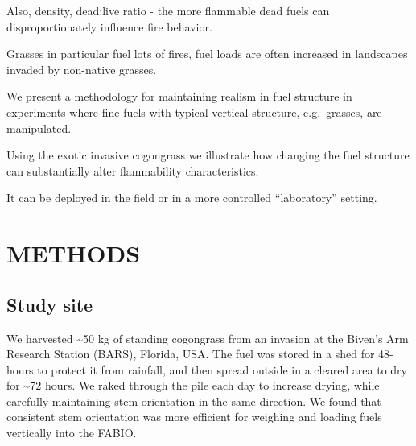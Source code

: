 \documentclass[11pt,a4paper]{article}
\begin{document}
Also, density, dead:live ratio - the more flammable dead fuels can
disproportionately influence fire behavior.

Grasses in particular fuel lots of fires, fuel loads are often increased
in landscapes invaded by non-native grasses.

We present a methodology for maintaining realism in fuel structure in
experiments where fine fuels with typical vertical structure,
e.g.~grasses, are manipulated.

Using the exotic invasive cogongrass we illustrate how changing the fuel
structure can substantially alter flammability characteristics.

It can be deployed in the field or in a more controlled ``laboratory''
setting.

\hypertarget{methods}{%
\section{METHODS}\label{methods}}

\hypertarget{study-site}{%
\subsection{Study site}\label{study-site}}

We harvested \textasciitilde{}50 kg of standing cogongrass from an
invasion at the Biven's Arm Research Station (BARS), Florida, USA. The
fuel was stored in a shed for 48-hours to protect it from rainfall, and
then spread outside in a cleared area to dry for \textasciitilde{}72
hours. We raked through the pile each day to increase drying, while
carefully maintaining stem orientation in the same direction. We found
that consistent stem orientation was more efficient for weighing and
loading fuels vertically into the FABIO.
\end{document}
